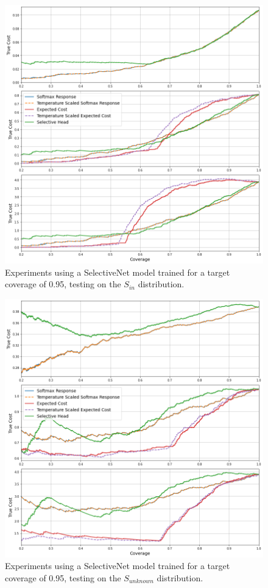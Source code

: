 \begin{figure}[H]
	\includegraphics[width=\textwidth]{images/binary/sn0.95_in_distribution.png}
	\caption*{Experiments using a SelectiveNet model trained for a target coverage of 0.95, testing on the $S_{in}$ distribution.}
\end{figure}

\begin{figure}[H]
	\includegraphics[width=\textwidth]{images/binary/sn0.95_out_distribution.png}
	\caption*{Experiments using a SelectiveNet model trained for a target coverage of 0.95, testing on the $S_{unknown}$ distribution.}
\end{figure}


